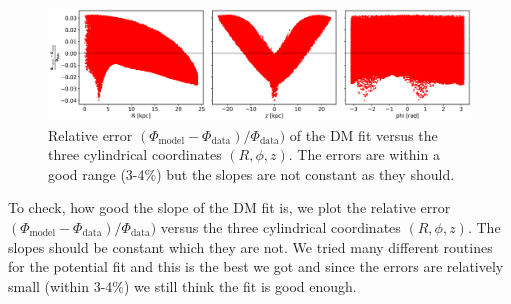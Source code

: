 \begin{figure}
\captionsetup{format=plain}
    \centering
    \includegraphics[width=\textwidth]{plots/Auriga/rel_phi_error_snap_127.png}
    \caption{Relative error $(\Phi_\mathrm{model} - \Phi_\mathrm{data})/\Phi_\mathrm{data})$ of the \ac{DM} fit versus the three cylindrical coordinates $(R, \phi, z)$. The errors are within a good range (3-4\%) but the slopes are not constant as they should.}
    \label{fig:potential_fit_rel_errors}
\end{figure}
To check, how good the slope of the \ac{DM} fit is, we plot the relative error $(\Phi_\mathrm{model} - \Phi_\mathrm{data})/\Phi_\mathrm{data})$ versus the three cylindrical coordinates $(R, \phi, z)$. The slopes should be constant which they are not. We tried many different routines for the potential fit and this is the best we got and since the errors are relatively small (within 3-4\%) we still think the fit is good enough.

